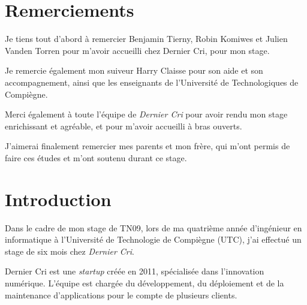 \section{Remerciements}\label{remerciements}

\bigskip

Je tiens tout d'abord à remercier Benjamin Tierny, Robin Komiwes et
Julien Vanden Torren pour m'avoir accueilli chez Dernier Cri, pour mon
stage.

\bigskip

Je remercie également mon suiveur Harry Claisse pour son aide et son
accompagnement, ainsi que les enseignants de l'Université de
Technologiques de Compiègne.

\bigskip

Merci également à toute l'équipe de \emph{Dernier Cri} pour avoir rendu
mon stage enrichissant et agréable, et pour m'avoir accueilli à bras
ouverts.

\bigskip

J'aimerai finalement remercier mes parents et mon frère, qui m'ont
permis de faire ces études et m'ont soutenu durant ce stage.

\newpage

\section{Introduction}\label{introduction}

\bigskip

Dans le cadre de mon stage de TN09, lors de ma quatrième année
d'ingénieur en informatique à l'Université de Technologie de Compiègne
(UTC), j'ai effectué un stage de six mois chez \emph{Dernier Cri}.

\bigskip

Dernier Cri est une \emph{startup} créée en 2011, spécialisée dans
l'innovation numérique. L'équipe est chargée du développement, du
déploiement et de la maintenance d'applications pour le compte de
plusieurs clients.


